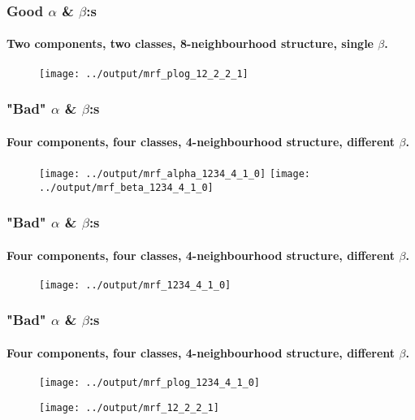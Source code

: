 \documentclass[12pt, english]{beamer}
\begin{document}
\begin{frame}
  \frametitle{Good $\alpha$ \& $\beta$:s}
  \framesubtitle{Two components, two classes, 8-neighbourhood structure, single $\beta$.}

\begin{figure}
\centering
\texttt{[image: ../output/mrf\_plog\_12\_2\_2\_1]}
    \caption*{}
    \label{fig:plog}  
\end{figure}
\end{frame}



\begin{frame}
  \frametitle{"Bad" $\alpha$ \& $\beta$:s}
  \framesubtitle{Four components, four classes, 4-neighbourhood structure, different $\beta$.}

\begin{figure}
\centering
\texttt{[image: ../output/mrf\_alpha\_1234\_4\_1\_0]}
\texttt{[image: ../output/mrf\_beta\_1234\_4\_1\_0]}
    \caption*{}
    \label{fig:alphabeta}  
\end{figure}
\end{frame}

\begin{frame}
  \frametitle{"Bad" $\alpha$ \& $\beta$:s}
  \framesubtitle{Four components, four classes, 4-neighbourhood structure, different $\beta$.}

\begin{figure}
\centering
\texttt{[image: ../output/mrf\_1234\_4\_1\_0]}
    \caption*{}
    \label{fig:mrf}  
\end{figure}
\end{frame}

\begin{frame}
  \frametitle{"Bad" $\alpha$ \& $\beta$:s}
  \framesubtitle{Four components, four classes, 4-neighbourhood structure, different $\beta$.}

\begin{figure}
\centering
\texttt{[image: ../output/mrf\_plog\_1234\_4\_1\_0]}
    \caption*{}
    \label{fig:mrf}  
\end{figure}
\end{frame}



\begin{frame}
\begin{figure}[h]
\centering

\begin{minipage}{1.0\textwidth}
\centering
\end{minipage}

\begin{minipage}{1.0\textwidth}
\centering
\texttt{[image: ../output/mrf\_12\_2\_2\_1]}
\caption*{}
\label{fig:brain}
\end{minipage}

\end{figure}
\end{frame}

\end{document}
